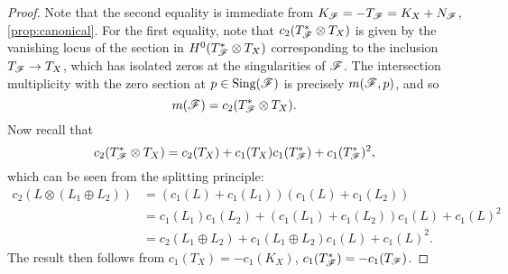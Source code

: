 \begin{proof}
    Note that the second equality is immediate from
    $K_{\mathscr{F}}=-T_{\mathscr{F}}=K_X+N_{\mathscr{F}}$, \cref{prop:canonical}. For the first
    equality, note that $c_2(T_{\mathscr{F}}^*\otimes T_X)$ is given by the vanishing
    locus of the section in $H^0(T_{\mathscr{F}}^*\otimes T_X)$ corresponding to the
    inclusion $T_{\mathscr{F}}\to T_X$, which has isolated zeros at the singularities of
    $\mathscr{F}$. The intersection multiplicity with the zero section at
    $p\in\operatorname{Sing}(\mathscr{F})$ is precisely $m(\mathscr{F},p)$, and so
    \begin{equation*}
        m(\mathscr{F}) = c_2(T_{\mathscr{F}}^*\otimes T_X).
    \end{equation*}
    Now recall that
    \begin{equation*}
        c_2(T_{\mathscr{F}}^*\otimes T_X)
            = c_2(T_X) + c_1(T_X)c_1(T_{\mathscr{F}}^*) + c_1(T_{\mathscr{F}}^*)^2,
    \end{equation*}
    which can be seen from the splitting principle:
    \begin{align*}
        c_2(L\otimes(L_1\oplus L_2))
            &= (c_1(L)+c_1(L_1))(c_1(L)+c_1(L_2)) \\
            &= c_1(L_1)c_1(L_2) + (c_1(L_1)+c_1(L_2))c_1(L) + c_1(L)^2 \\
            &= c_2(L_1\oplus L_2) + c_1(L_1\oplus L_2)c_1(L) + c_1(L)^2.
    \end{align*}
    The result then follows from $c_1(T_X)=-c_1(K_X)$,
    $c_1(T_{\mathscr{F}}^*)=-c_1(T_{\mathscr{F}})$.
\end{proof}

